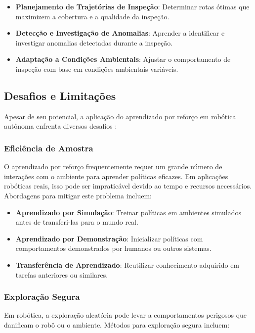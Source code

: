 \begin{itemize}
    \item \textbf{Planejamento de Trajetórias de Inspeção}: Determinar rotas ótimas que maximizem a cobertura e a qualidade da inspeção.
    \item \textbf{Detecção e Investigação de Anomalias}: Aprender a identificar e investigar anomalias detectadas durante a inspeção.
    \item \textbf{Adaptação a Condições Ambientais}: Ajustar o comportamento de inspeção com base em condições ambientais variáveis.
\end{itemize}

\subsection{Desafios e Limitações}

Apesar de seu potencial, a aplicação do aprendizado por reforço em robótica autônoma enfrenta diversos desafios \cite{Kober2013, Arulkumaran2017DeepRL}:

\subsubsection{Eficiência de Amostra}

O aprendizado por reforço frequentemente requer um grande número de interações com o ambiente para aprender políticas eficazes. Em aplicações robóticas reais, isso pode ser impraticável devido ao tempo e recursos necessários. Abordagens para mitigar este problema incluem:

\begin{itemize}
    \item \textbf{Aprendizado por Simulação}: Treinar políticas em ambientes simulados antes de transferi-las para o mundo real.
    \item \textbf{Aprendizado por Demonstração}: Inicializar políticas com comportamentos demonstrados por humanos ou outros sistemas.
    \item \textbf{Transferência de Aprendizado}: Reutilizar conhecimento adquirido em tarefas anteriores ou similares.
\end{itemize}

\subsubsection{Exploração Segura}

Em robótica, a exploração aleatória pode levar a comportamentos perigosos que danificam o robô ou o ambiente. Métodos para exploração segura incluem:

